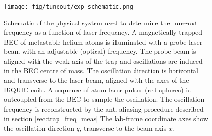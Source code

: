 	\begin{figure}
	\begin{minipage}{0.5\textwidth}
	\vspace{0pt}
	\texttt{[image: fig/tuneout/exp\_schematic.png]}
	\end{minipage}
	\hfill
	\begin{minipage}{0.5\textwidth}
	\vspace{0pt}
	\caption{
	Schematic of the physical system used to determine the tune-out frequency as a function of laser frequency. A magnetically trapped BEC of metastable helium atoms is illuminated with a probe laser beam with an adjustable (optical) frequency. The probe beam is aligned with the weak axis of the trap and oscillations are induced in the BEC centre of mass. The oscillation direction is horizontal and transverse to the laser beam, aligned with the axes of the BiQUIC coils.  A sequence of atom laser pulses (red spheres) is outcoupled from the BEC to sample the oscillation. The oscillation frequency is reconstructed by the anti-aliasing procedure described in section \ref{sec:trap_freq_meas}
	The lab-frame coordinate axes show the oscillation direction $y$, transverse to the beam axis $x$.
	}
	\label{fig:exp_schematic} 
	\end{minipage}
	\end{figure}

